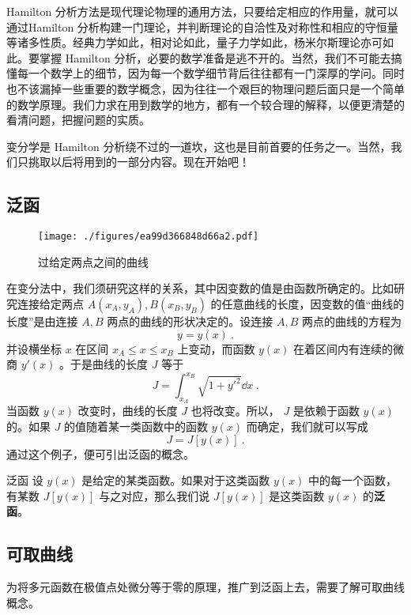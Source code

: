 
Hamilton 分析方法是现代理论物理的通用方法，只要给定相应的作用量，就可以通过Hamilton 分析构建一门理论，并判断理论的自洽性及对称性和相应的守恒量等诸多性质。经典力学如此，相对论如此，量子力学如此，杨米尔斯理论亦可如此。要掌握 Hamilton 分析，必要的数学准备是逃不开的。当然，我们不可能去搞懂每一个数学上的细节，因为每一个数学细节背后往往都有一门深厚的学问。同时也不该漏掉一些重要的数学概念，因为往往一个艰巨的物理问题后面只是一个简单的数学原理。我们力求在用到数学的地方，都有一个较合理的解释，以便更清楚的看清问题，把握问题的实质。

变分学是 Hamilton 分析绕不过的一道坎，这也是目前首要的任务之一。当然，我们只挑取以后将用到的一部分内容。现在开始吧！
\subsection{泛函}
\begin{figure}[ht]
\centering
\texttt{[image: ./figures/ea99d366848d66a2.pdf]}
\caption{过给定两点之间的曲线} \label{fig_DesCur_1}
\end{figure}
在变分法中，我们须研究这样的关系，其中因变数的值是由函数所确定的。比如研究连接给定两点 $A(x_A,y_A),B(x_B,y_B)$ 的任意曲线的长度，因变数的值“曲线的长度”是由连接 $A,B$ 两点的曲线的形状决定的。设连接 $A,B$ 两点的曲线的方程为
\begin{equation}
y=y(x)~.
\end{equation}
并设横坐标 $x$ 在区间 $x_A\leq x\leq x_B$ 上变动，而函数 $y(x)$ 在着区间内有连续的微商 $y'(x)$ 。于是曲线的长度 $J$ 等于
\begin{equation}
J=\int_{x_A}^{x_B} \sqrt{1+y'^2}\dd x~.
\end{equation}
当函数 $y(x)$ 改变时，曲线的长度 $J$ 也将改变。所以， $J$ 是依赖于函数 $y(x)$ 的。如果 $J$ 的值随着某一类函数中的函数 $y(x)$ 而确定，我们就可以写成
\begin{equation}
J=J[y(x)]~.
\end{equation}
通过这个例子，便可引出泛函的概念。
\begin{definition}{泛函}
设 $y(x)$ 是给定的某类函数。如果对于这类函数 $y(x)$ 中的每一个函数，有某数 $J[y(x)]$ 与之对应，那么我们说 $J[y(x)]$ 是这类函数 $y(x)$ 的\textbf{泛函}。
\end{definition}
\subsection{可取曲线}\label{sub_DesCur_1}
为将多元函数在极值点处微分等于零的原理，推广到泛函上去，需要了解可取曲线概念。

